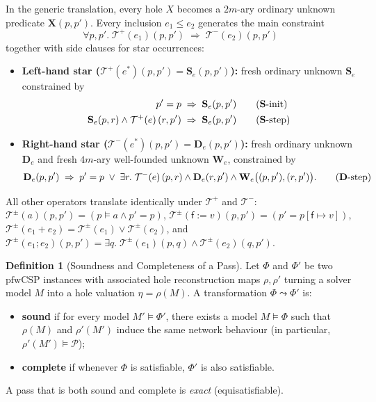 \documentclass[11pt,a4paper]{article}
\theoremstyle{definition}
\newtheorem{definition}[theorem]{Definition}
\theoremstyle{remark}
\newcommand{\Tpos}[1]{\mathcal{T}^{+}\!\left(#1\right)}
\newcommand{\Tneg}[1]{\mathcal{T}^{-}\!\left(#1\right)}
\begin{document}
In the generic translation, every hole $X$ becomes a $2m$-ary ordinary unknown predicate
$\mathbf{X}(p, p')$. Every inclusion $e_1 \le e_2$ generates the main constraint
\[
  \forall p, p'.\; \Tpos{e_1}(p, p') \;\Rightarrow\; \Tneg{e_2}(p, p')
\]
together with side clauses for star occurrences:
\begin{itemize}
  \item \textbf{Left-hand star ($\Tpos{e^*}(p, p') = \mathbf{S}_e(p, p')$):} fresh ordinary unknown
        $\mathbf{S}_e$ constrained by
        \begin{align}
          p' = p &\;\Rightarrow\; \mathbf{S}_e(p, p') \tag{$\mathbf{S}$-init} \\
          \mathbf{S}_e(p, r) \land \Tpos{e}(r, p') &\;\Rightarrow\; \mathbf{S}_e(p, p') \tag{$\mathbf{S}$-step}
        \end{align}
  \item \textbf{Right-hand star ($\Tneg{e^*}(p, p') = \mathbf{D}_e(p, p')$):} fresh ordinary unknown
        $\mathbf{D}_e$ and fresh $4m$-ary well-founded unknown $\mathbf{W}_e$, constrained by
        \begin{equation}
          \mathbf{D}_e(p, p') \;\Rightarrow\; p' = p \;\lor\;
          \exists r.\; \Tneg{e}(p, r) \land \mathbf{D}_e(r, p') \land \mathbf{W}_e\bigl((p, p'), (r, p')\bigr).
          \tag{$\mathbf{D}$-step}
        \end{equation}
\end{itemize}
All other operators translate identically under $\mathcal{T}^+$ and $\mathcal{T}^-$:
$\mathcal{T}^\pm(a)(p,p') = (p \models a \land p' = p)$,
$\mathcal{T}^\pm(\mathsf{f} := v)(p,p') = (p' = p[\mathsf{f} \mapsto v])$,
$\mathcal{T}^\pm(e_1 + e_2) = \mathcal{T}^\pm(e_1) \lor \mathcal{T}^\pm(e_2)$, and
$\mathcal{T}^\pm(e_1 ; e_2)(p,p') = \exists q.\; \mathcal{T}^\pm(e_1)(p,q) \land \mathcal{T}^\pm(e_2)(q,p')$.

\begin{definition}[Soundness and Completeness of a Pass]
Let $\Phi$ and $\Phi'$ be two $\text{pfwCSP}$ instances with associated hole reconstruction maps
$\rho, \rho'$ turning a solver model $M$ into a hole valuation $\eta = \rho(M)$. A transformation
$\Phi \leadsto \Phi'$ is:
\begin{itemize}
  \item \textbf{sound} if for every model $M' \models \Phi'$, there exists a model $M \models \Phi$
        such that $\rho(M)$ and $\rho'(M')$ induce the same network behaviour (in particular,
        $\rho'(M') \models \mathcal{P}$);
  \item \textbf{complete} if whenever $\Phi$ is satisfiable, $\Phi'$ is also satisfiable.
\end{itemize}
A pass that is both sound and complete is \emph{exact} (equisatisfiable).
\end{definition}
\end{document}

